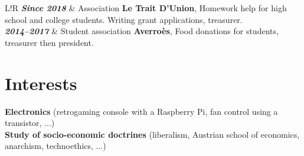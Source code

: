\documentclass[10pt]{article}
\newcommand\VRule{\color{lightgray}\vrule width 2pt}
\begin{document}
\vspace{2ex}

\begin{tabular}{L!{\VRule}R}
\textbf{\textit{Since 2018}} & Association \textbf{Le Trait D’Union}, Homework help for high school and college students. Writing grant applications, treasurer. \\[0.75cm]

\textbf{\textit{2014--2017}} & Student association \textbf{Averroès}, Food donations for students, treasurer then president. \\
\end{tabular}

\vspace{2ex}

\section*{Interests}

\vspace{2ex}

\hspace*{1ex} \textbf{Electronics} (retrogaming console with a Raspberry Pi, fan control using a transistor, ...) \\
\hspace*{1ex} \textbf{Study of socio-economic doctrines} (liberalism, Austrian school of economics, anarchism, technoethics, ...) \\
\end{document}
